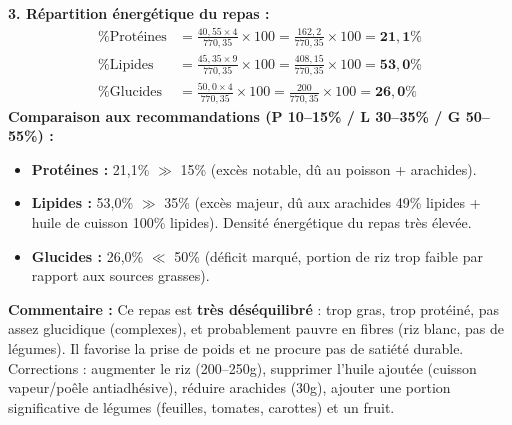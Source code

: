 \documentclass[11pt]{article}
\begin{document}
\begin{corrige}
\textbf{3. Répartition énergétique du repas :}
\begin{align*}
\% \text{Protéines} &= \frac{40,55 \times 4}{770,35} \times 100 = \frac{162,2}{770,35} \times 100 = \mathbf{21,1\%} \\
\% \text{Lipides} &= \frac{45,35 \times 9}{770,35} \times 100 = \frac{408,15}{770,35} \times 100 = \mathbf{53,0\%} \\
\% \text{Glucides} &= \frac{50,0 \times 4}{770,35} \times 100 = \frac{200}{770,35} \times 100 = \mathbf{26,0\%}
\end{align*}
\textbf{Comparaison aux recommandations (P 10--15\% / L 30--35\% / G 50--55\%) :}
\begin{itemize}
\item \textbf{Protéines :} 21,1\% $\gg$ 15\% (excès notable, dû au poisson + arachides).
\item \textbf{Lipides :} 53,0\% $\gg$ 35\% (excès majeur, dû aux arachides 49\% lipides + huile de cuisson 100\% lipides). Densité énergétique du repas très élevée.
\item \textbf{Glucides :} 26,0\% $\ll$ 50\% (déficit marqué, portion de riz trop faible par rapport aux sources grasses).
\end{itemize}
\textbf{Commentaire :} Ce repas est \textbf{très déséquilibré} : trop gras, trop protéiné, pas assez glucidique (complexes), et probablement pauvre en fibres (riz blanc, pas de légumes). Il favorise la prise de poids et ne procure pas de satiété durable. Corrections : augmenter le riz (200--250g), supprimer l'huile ajoutée (cuisson vapeur/poêle antiadhésive), réduire arachides (30g), ajouter une portion significative de légumes (feuilles, tomates, carottes) et un fruit.
\end{corrige}
\end{document}
